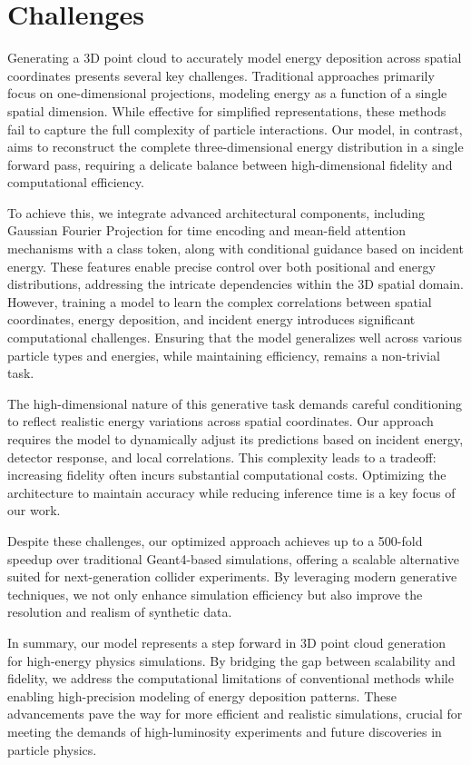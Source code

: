 \section{Challenges}

Generating a 3D point cloud to accurately model energy deposition across spatial coordinates presents several key challenges. Traditional approaches primarily focus on one-dimensional projections, modeling energy as a function of a single spatial dimension. While effective for simplified representations, these methods fail to capture the full complexity of particle interactions. Our model, in contrast, aims to reconstruct the complete three-dimensional energy distribution in a single forward pass, requiring a delicate balance between high-dimensional fidelity and computational efficiency.

To achieve this, we integrate advanced architectural components, including Gaussian Fourier Projection for time encoding and mean-field attention mechanisms with a class token, along with conditional guidance based on incident energy. These features enable precise control over both positional and energy distributions, addressing the intricate dependencies within the 3D spatial domain. However, training a model to learn the complex correlations between spatial coordinates, energy deposition, and incident energy introduces significant computational challenges. Ensuring that the model generalizes well across various particle types and energies, while maintaining efficiency, remains a non-trivial task.

The high-dimensional nature of this generative task demands careful conditioning to reflect realistic energy variations across spatial coordinates. Our approach requires the model to dynamically adjust its predictions based on incident energy, detector response, and local correlations. This complexity leads to a tradeoff: increasing fidelity often incurs substantial computational
costs. Optimizing the architecture to maintain accuracy while reducing inference time is a key focus of our work.

Despite these challenges, our optimized approach achieves up to a 500-fold speedup over traditional Geant4-based simulations, offering a scalable alternative suited for next-generation collider experiments. By leveraging modern generative techniques, we not only enhance simulation efficiency but also improve the resolution and realism of synthetic data.

In summary, our model represents a step forward in 3D point cloud generation for high-energy physics simulations. By bridging the gap between scalability and fidelity, we address the computational limitations of conventional methods while enabling high-precision modeling of energy deposition patterns. These advancements pave the way for more efficient and realistic simulations, crucial for meeting the demands of high-luminosity experiments and future discoveries in particle physics.
